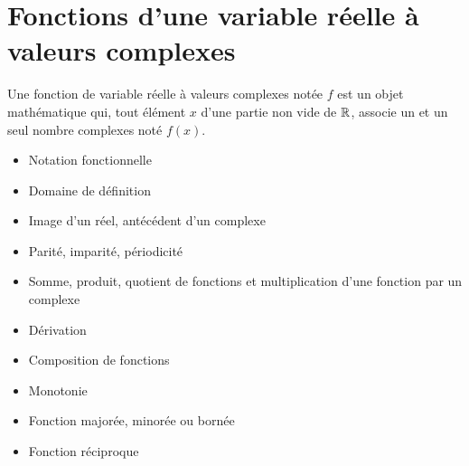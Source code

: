 \section{Fonctions d'une variable réelle à valeurs complexes}

\begin{defi}
	Une fonction de variable réelle à valeurs complexes notée \(f\) est un objet mathématique qui, tout élément \(x\) d’une partie non vide de \(\mathbb{R}\), associe un et un seul nombre complexes noté \(f (x)\).
\end{defi}

\begin{defprop}
	\begin{itemize}
		\item Notation fonctionnelle
		\item Domaine de définition
		\item Image d’un réel, antécédent d’un complexe
		\item Parité, imparité, périodicité
		\item Somme, produit, quotient de fonctions et multiplication d’une fonction par un complexe
		\item Dérivation
	\end{itemize}
\end{defprop}


\begin{defprop}
	\begin{itemize}
		\item Composition de fonctions
		\item Monotonie
		\item Fonction majorée, minorée ou bornée
		\item Fonction réciproque
	\end{itemize}
\end{defprop}

